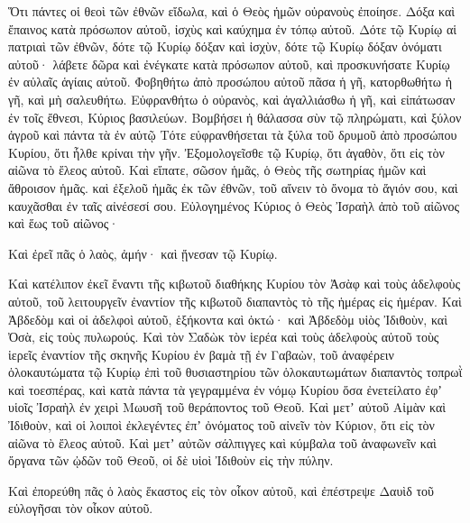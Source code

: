 {Ὅτι πάντες οἱ θεοὶ τῶν ἐθνῶν εἴδωλα, καὶ ὁ Θεὸς ἡμῶν οὐρανοὺς ἐποίησε.
Δόξα καὶ ἔπαινος κατὰ πρόσωπον αὐτοῦ, ἰσχὺς καὶ καύχημα ἐν τόπῳ αὐτοῦ.
Δότε τῷ Κυρίῳ αἱ πατριαὶ τῶν ἐθνῶν, δότε τῷ Κυρίῳ δόξαν καὶ ἰσχὺν,
δότε τῷ Κυρίῳ δόξαν ὀνόματι αὐτοῦ· λάβετε δῶρα καὶ ἐνέγκατε κατὰ πρόσωπον αὐτοῦ, καὶ προσκυνήσατε Κυρίῳ ἐν αὐλαῖς ἁγίαις αὐτοῦ.
Φοβηθήτω ἀπὸ προσώπου αὐτοῦ πᾶσα ἡ γῆ, κατορθωθήτω ἡ γῆ, καὶ μὴ σαλευθήτω.
Εὐφρανθήτω ὁ οὐρανὸς, καὶ ἀγαλλιάσθω ἡ γῆ, καὶ εἰπάτωσαν ἐν τοῖς ἔθνεσι, Κύριος βασιλεύων.
Βομβήσει ἡ θάλασσα σὺν τῷ πληρώματι, καὶ ξύλον ἀγροῦ καὶ πάντα τὰ ἐν αὐτῷ
Τότε εὐφρανθήσεται τὰ ξύλα τοῦ δρυμοῦ ἀπὸ προσώπου Κυρίου, ὅτι ἦλθε κρίναι τὴν γῆν.
Ἐξομολογεῖσθε τῷ Κυρίῳ, ὅτι ἀγαθὸν, ὅτι εἰς τὸν αἰῶνα τὸ ἔλεος αὐτοῦ.
Καὶ εἴπατε, σῶσον ἡμᾶς, ὁ Θεὸς τῆς σωτηρίας ἡμῶν καὶ ἄθροισον ἡμᾶς. καὶ ἐξελοῦ ἡμᾶς ἐκ τῶν ἐθνῶν, τοῦ αἴνειν τὸ ὄνομα τὸ ἅγιόν σου, καὶ καυχᾶσθαι ἐν ταῖς αἰνέσεσί σου.
Εὐλογημένος Κύριος ὁ Θεὸς Ἰσραὴλ ἀπὸ τοῦ αἰῶνος καὶ ἕως τοῦ αἰῶνος·
\par }{\PP Καὶ ἐρεῖ πᾶς ὁ λαὸς, ἀμήν· καὶ ᾔνεσαν τῷ Κυρίῳ.
\par }{\PP {}Καὶ κατέλιπον ἐκεῖ ἔναντι τῆς κιβωτοῦ διαθήκης Κυρίου τὸν Ἀσὰφ καὶ τοὺς ἀδελφοὺς αὐτοῦ, τοῦ λειτουργεῖν ἐναντίον τῆς κιβωτοῦ διαπαντὸς τὸ τῆς ἡμέρας εἰς ἡμέραν.
Καὶ Ἀβδεδὸμ καὶ οἱ ἀδελφοὶ αὐτοῦ, ἑξήκοντα καὶ ὀκτώ· καὶ Ἀβδεδὸμ υἱὸς Ἰδιθοὺν, καὶ Ὀσὰ, εἰς τοὺς πυλωρούς.
Καὶ τὸν Σαδὼκ τὸν ἱερέα καὶ τοὺς ἀδελφοὺς αὐτοῦ τοὺς ἱερεῖς ἐναντίον τῆς σκηνῆς Κυρίου ἐν βαμὰ τῇ ἐν Γαβαὼν,
τοῦ ἀναφέρειν ὁλοκαυτώματα τῷ Κυρίῳ ἐπὶ τοῦ θυσιαστηρίου τῶν ὁλοκαυτωμάτων διαπαντὸς τοπρωῒ καὶ τοεσπέρας, καὶ κατὰ πάντα τὰ γεγραμμένα ἐν νόμῳ Κυρίου ὅσα ἐνετείλατο ἐφʼ υἱοῖς Ἰσραὴλ ἐν χειρὶ Μωυσῆ τοῦ θεράποντος τοῦ Θεοῦ.
Καὶ μετʼ αὐτοῦ Αἰμὰν καὶ Ἰδιθοὺν, καὶ οἱ λοιποὶ ἐκλεγέντες ἐπʼ ὀνόματος τοῦ αἰνεῖν τὸν Κύριον, ὅτι εἰς τὸν αἰῶνα τὸ ἔλεος αὐτοῦ.
Καὶ μετʼ αὐτῶν σάλπιγγες καὶ κύμβαλα τοῦ ἀναφωνεῖν καὶ ὄργανα τῶν ᾠδῶν τοῦ Θεοῦ, οἱ δὲ υἱοὶ Ἰδιθοὺν εἰς τὴν πύλην.
\par }{\PP {}Καὶ ἐπορεύθη πᾶς ὁ λαὸς ἕκαστος εἰς τὸν οἶκον αὐτοῦ, καὶ ἐπέστρεψε Δαυὶδ τοῦ εὐλογῆσαι τὸν οἶκον αὐτοῦ.

}

